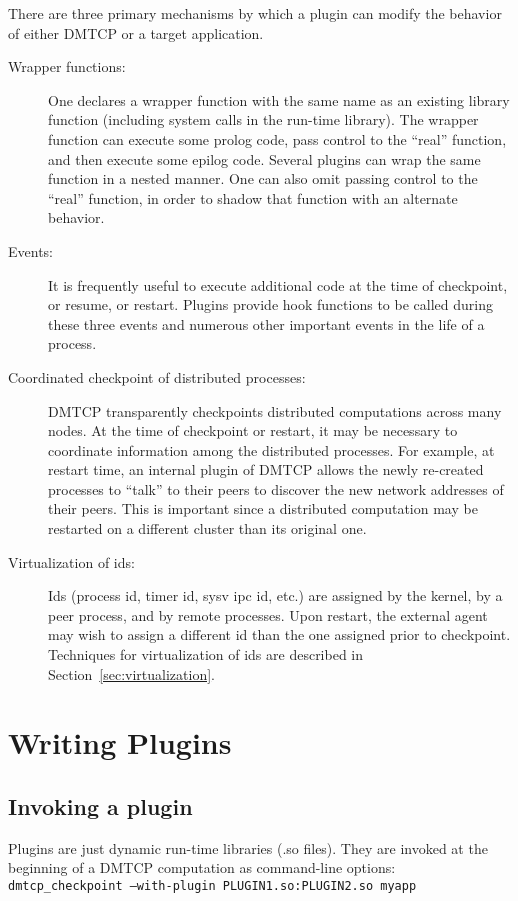 \documentclass{article}
\begin{document}
There are three primary mechanisms by which a plugin can modify the
behavior of either DMTCP or a target application.
\begin{description}
\item[Wrapper functions:]  One declares a wrapper function with the same
	name as an existing library function (including system calls in
	the run-time library).  The wrapper function can execute some
	prolog code, pass control to the ``real'' function,
	and then execute some epilog code.  Several plugins can wrap
	the same function in a nested manner.  One can also omit
	passing control to the ``real'' function, in order to shadow
	that function with an alternate behavior.
\item[Events:]  It is frequently useful to execute additional code
	at the time of checkpoint, or resume, or restart.  Plugins
	provide hook functions	to be called during these three events
	and numerous other important events in the life of a process.
\item[Coordinated checkpoint of distributed processes:]  DMTCP transparently
	checkpoints distributed computations across many nodes.
	At the time of checkpoint or restart, it may be necessary to
	coordinate information among the distributed processes.  For example,
	at restart time, an internal plugin of DMTCP allows the newly
	re-created processes to ``talk'' to their peers to discover the
	new network addresses of their peers.  This is important since
	a distributed computation may be restarted on a different cluster
	than its original one.
\item[Virtualization of ids:]  Ids (process id, timer id, sysv ipc id, etc.)
	are assigned by the kernel, by a peer process, and by remote processes.
	Upon restart, the external agent may wish to assign a different
	id than the one assigned prior to checkpoint.  Techniques for
	virtualization of ids are described in Section~\ref{sec:virtualization}.
\end{description}

\section{Writing Plugins}

\subsection{Invoking a plugin}

Plugins are just dynamic run-time libraries (.so files).  They are
invoked at the beginning of a DMTCP computation as command-line options:
\hfill\break
\medskip\noindent
  \hspace{0.3truein} {\tt dmtcp\_checkpoint --with-plugin PLUGIN1.so:PLUGIN2.so myapp}
\medskip
\end{document}
